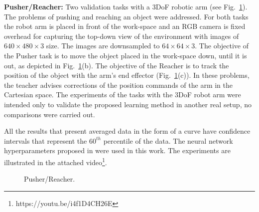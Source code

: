 \textbf{Pusher/Reacher:} Two validation tasks with a 3DoF robotic arm (see Fig.~\ref{fig:PusherReacher}). The problems of pushing  and reaching an object were addressed.  
For both tasks the robot arm is placed in front of the work-space and an RGB camera is fixed overhead for capturing the top-down view of the environment with images of $640\times480\times3$ size. The images are downsampled to $64\times64\times3$. The objective of the Pusher task is to move the object placed in the work-space down, until it is out, as depicted in Fig.~\ref{fig:PusherReacher}(b). The objective of the Reacher is to track the position of the object with the arm's end effector (Fig.~\ref{fig:PusherReacher}(c)). In these problems, the teacher advises corrections of the position commands of the arm in the Cartesian space. The experiments of the tasks with the 3DoF robot arm were intended only to validate the proposed learning method in another real setup, no comparisons were carried out.

All the results that present averaged data in the form of a curve have confidence intervals that represent the $60^{th}$ percentile of the data.
The neural network hyperparameters proposed in \cite{perez2018interactive} were used in this work. The experiments are illustrated in the attached video\footnote{https://youtu.be/i4f1D4CH26E}. 

\begin{figure}[t]
\centering
{} 
\hspace{0.25cm}
\hspace{0.25cm}
\hspace{0.25cm}
\caption{Pusher/Reacher.} 
\label{fig:PusherReacher} 
\end{figure}


